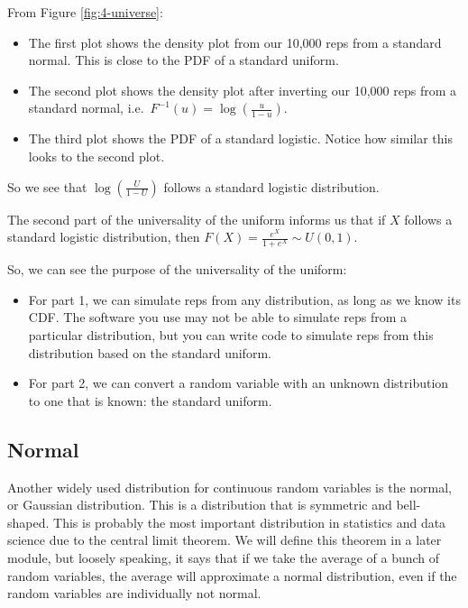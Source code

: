 \documentclass[
]{book}
\providecommand{\tightlist}{%
  \setlength{\itemsep}{0pt}\setlength{\parskip}{0pt}}
\begin{document}
From Figure \ref{fig:4-universe}:

\begin{itemize}
\tightlist
\item
  The first plot shows the density plot from our 10,000 reps from a standard normal. This is close to the PDF of a standard uniform.
\item
  The second plot shows the density plot after inverting our 10,000 reps from a standard normal, i.e.~\(F^{-1}(u) = \log (\frac{u}{1-u})\).
\item
  The third plot shows the PDF of a standard logistic. Notice how similar this looks to the second plot.
\end{itemize}

So we see that \(\log (\frac{U}{1-U})\) follows a standard logistic distribution.

The second part of the universality of the uniform informs us that if \(X\) follows a standard logistic distribution, then \(F(X) = \frac{e^X}{1 + e^X} \sim U(0,1)\).

So, we can see the purpose of the universality of the uniform:

\begin{itemize}
\tightlist
\item
  For part 1, we can simulate reps from any distribution, as long as we know its CDF. The software you use may not be able to simulate reps from a particular distribution, but you can write code to simulate reps from this distribution based on the standard uniform.
\item
  For part 2, we can convert a random variable with an unknown distribution to one that is known: the standard uniform.
\end{itemize}

\subsection{Normal}\label{normdist}

Another widely used distribution for continuous random variables is the normal, or Gaussian distribution. This is a distribution that is symmetric and bell-shaped. This is probably the most important distribution in statistics and data science due to the central limit theorem. We will define this theorem in a later module, but loosely speaking, it says that if we take the average of a bunch of random variables, the average will approximate a normal distribution, even if the random variables are individually not normal.
\end{document}
